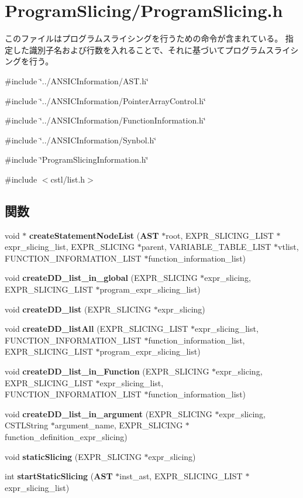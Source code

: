 \section{ProgramSlicing/ProgramSlicing.h}
\label{ProgramSlicing_8h}


このファイルはプログラムスライシングを行うための命令が含まれている。 指定した識別子名および行数を入れることで、それに基づいてプログラムスライシングを行う。  


{\ttfamily \#include \char`\"{}../ANSICInformation/AST.h\char`\"{}}\par
{\ttfamily \#include \char`\"{}../ANSICInformation/PointerArrayControl.h\char`\"{}}\par
{\ttfamily \#include \char`\"{}../ANSICInformation/FunctionInformation.h\char`\"{}}\par
{\ttfamily \#include \char`\"{}../ANSICInformation/Synbol.h\char`\"{}}\par
{\ttfamily \#include \char`\"{}ProgramSlicingInformation.h\char`\"{}}\par
{\ttfamily \#include $<$cstl/list.h$>$}\par
\subsection*{関数}
\begin{DoxyCompactItemize}
\item 
void $\ast$ {\bf createStatementNodeList} ({\bf AST} $\ast$root, EXPR\_\-SLICING\_\-LIST $\ast$expr\_\-slicing\_\-list, EXPR\_\-SLICING $\ast$parent, VARIABLE\_\-TABLE\_\-LIST $\ast$vtlist, FUNCTION\_\-INFORMATION\_\-LIST $\ast$function\_\-information\_\-list)
\item 
void {\bf createDD\_\-list\_\-in\_\-global} (EXPR\_\-SLICING $\ast$expr\_\-slicing, EXPR\_\-SLICING\_\-LIST $\ast$program\_\-expr\_\-slicing\_\-list)
\item 
void {\bf createDD\_\-list} (EXPR\_\-SLICING $\ast$expr\_\-slicing)
\item 
void {\bf createDD\_\-listAll} (EXPR\_\-SLICING\_\-LIST $\ast$expr\_\-slicing\_\-list, FUNCTION\_\-INFORMATION\_\-LIST $\ast$function\_\-information\_\-list, EXPR\_\-SLICING\_\-LIST $\ast$program\_\-expr\_\-slicing\_\-list)
\item 
void {\bf createDD\_\-list\_\-in\_\-Function} (EXPR\_\-SLICING $\ast$expr\_\-slicing, EXPR\_\-SLICING\_\-LIST $\ast$expr\_\-slicing\_\-list, FUNCTION\_\-INFORMATION\_\-LIST $\ast$function\_\-information\_\-list)
\item 
void {\bf createDD\_\-list\_\-in\_\-argument} (EXPR\_\-SLICING $\ast$expr\_\-slicing, CSTLString $\ast$argument\_\-name, EXPR\_\-SLICING $\ast$function\_\-definition\_\-expr\_\-slicing)
\item 
void {\bf staticSlicing} (EXPR\_\-SLICING $\ast$expr\_\-slicing)
\item 
int {\bf startStaticSlicing} ({\bf AST} $\ast$inst\_\-ast, EXPR\_\-SLICING\_\-LIST $\ast$expr\_\-slicing\_\-list)
\end{DoxyCompactItemize}


